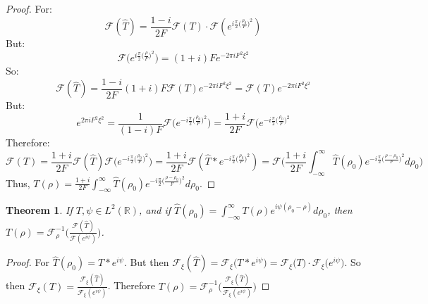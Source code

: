 \documentclass{article}
\theoremstyle{mystyle}
\newtheorem{theorem}{Theorem}[section]
\begin{document}
\begin{proof}
For:
\begin{equation*}
    \mathcal{F}(\hat{T}) = \frac{1-i}{2F}\mathcal{F}(T)\cdot \mathcal{F}(e^{i\frac{\pi}{2}\big(\frac{\rho_0}{F}\big)^2})
\end{equation*}
But:
\begin{equation*}
    \mathcal{F}\big(e^{i\frac{\pi}{2}\big(\frac{\rho}{F}\big)^2}\big) = (1+i)Fe^{-2\pi i F^2 \xi^2}    
\end{equation*}
So:
\begin{equation*}
    \mathcal{F}(\hat{T}) =\frac{1-i}{2F}(1+i)F \mathcal{F}(T) e^{-2\pi i F^2 \xi^2} = \mathcal{F}(T)e^{-2\pi i F^2 \xi^2}    
\end{equation*}
But:
\begin{equation*}
    e^{2\pi i F^2 \xi^2} = \frac{1}{(1-i)F}\mathcal{F}\big(e^{-i\frac{\pi}{2}\big(\frac{\rho_0}{F}\big)^2}\big) = \frac{1+i}{2F} \mathcal{F}\big(e^{-i\frac{\pi}{2}\big(\frac{\rho_0}{F}\big)^2}    
\end{equation*}
Therefore:
\begin{equation*}
    \mathcal{F}(T) = \frac{1+i}{2F}\mathcal{F}(\hat{T})\mathcal{F}\big(e^{-i\frac{\pi}{2}\big(\frac{\rho_0}{F}\big)^2}\big) = \frac{1+i}{2F}\mathcal{F}(\hat{T}* e^{-i\frac{\pi}{2}\big(\frac{\rho_0}{F}\big)^2}) = \mathcal{F}\bigg(\frac{1+i}{2F}\int_{-\infty}^{\infty} \hat{T}(\rho_0)e^{-i\frac{\pi}{2}\big(\frac{\rho - \rho_0}{F}\big)^2} d\rho_0\bigg)    
\end{equation*}
Thus, $T(\rho) = \frac{1+i}{2F}\int_{-\infty}^{\infty}\hat{T}(\rho_0)e^{-i\frac{\pi}{2}\big(\frac{\rho - \rho_0}{F}\big)^2}d\rho_0$.
\end{proof}

\begin{theorem}
If $T,\psi \in L^2(\mathbb{R})$, and if $\hat{T}(\rho_0) = \int_{-\infty}^{\infty} T(\rho)e^{i\psi(\rho_0-\rho)}d\rho_0$, then $T(\rho) = \mathcal{F}^{-1}_{\rho}\big(\frac{\mathcal{F}(\hat{T})}{\mathcal{F}(e^{i\psi})}\big)$.
\end{theorem}
\begin{proof}
For $\hat{T}(\rho_0) = T* e^{i\psi}$. But then $\mathcal{F}_{\xi}(\hat{T}) = \mathcal{F}_{\xi}\big(T* e^{i\psi}\big) = \mathcal{F}_{\xi}\big(T\big)\cdot \mathcal{F}_{\xi}\big(e^{i\psi}\big)$. So then $\mathcal{F}_{\xi}(T) = \frac{\mathcal{F}_{\xi}(\hat{T})}{\mathcal{F}_{\xi}(e^{i\psi})}$. Therefore $T(\rho) = \mathcal{F}^{-1}_{\rho}\big(\frac{\mathcal{F}_{\xi}(\hat{T})}{\mathcal{F}_{\xi}(e^{i\psi})}\big)$
\end{proof}
\end{document}
